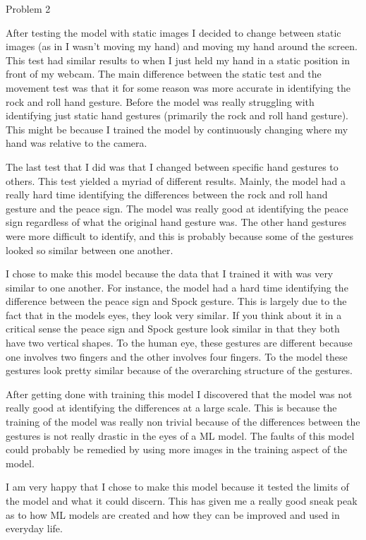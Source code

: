 \begin{problem}{Problem 2}
\begin{highlight}[Solution]
        After testing the model with static images I decided to change between static images (as in I wasn't moving my hand) and moving my hand around the screen. This test had similar results to when
        I just held my hand in a static position in front of my webcam. The main difference between the static test and the movement test was that it for some reason was more accurate in identifying
        the rock and roll hand gesture. Before the model was really struggling with identifying just static hand gestures (primarily the rock and roll hand gesture). This might be because I trained the
        model by continuously changing where my hand was relative to the camera.

        The last test that I did was that I changed between specific hand gestures to others. This test yielded a myriad of different results. Mainly, the model had a really hard time identifying the
        differences between the rock and roll hand gesture and the peace sign. The model was really good at identifying the peace sign regardless of what the original hand gesture was. The other hand
        gestures were more difficult to identify, and this is probably because some of the gestures looked so similar between one another.

        I chose to make this model because the data that I trained it with was very similar to one another. For instance, the model had a hard time identifying the difference between the peace sign
        and Spock gesture. This is largely due to the fact that in the models eyes, they look very similar. If you think about it in a critical sense the peace sign and Spock gesture look similar in 
        that they both have two vertical shapes. To the human eye, these gestures are different because one involves two fingers and the other involves four fingers. To the model these gestures look
        pretty similar because of the overarching structure of the gestures.

        After getting done with training this model I discovered that the model was not really good at identifying the differences at a large scale. This is because the training of the model was really
        non trivial because of the differences between the gestures is not really drastic in the eyes of a ML model. The faults of this model could probably be remedied by using more images in the training
        aspect of the model. 

        I am very happy that I chose to make this model because it tested the limits of the model and what it could discern. This has given me a really good sneak peak as to how ML models are created
        and how they can be improved and used in everyday life.
    \end{highlight}
\end{problem}

